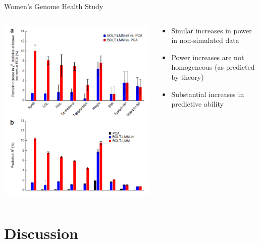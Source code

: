 \documentclass[aspectratio=169]{beamer}\usepackage[]{graphicx}\usepackage[]{color}
\begin{document}
\begin{frame}{Women's Genome Health Study}
\begin{columns}[onlytextwidth]
\begin{column}{0.5\textwidth}
\includegraphics[scale=.3]{./figure/WGHSPerf.png}
\end{column}
\begin{column}{0.5\textwidth}
\begin{itemize}
\item Similar increases in power in non-simulated data
\item Power increases are not homogeneous (as predicted by theory) 
\item Substantial increases in predictive ability
\end{itemize}
\end{column}
\end{columns}
\end{frame}

\section{Discussion}
\end{document}
